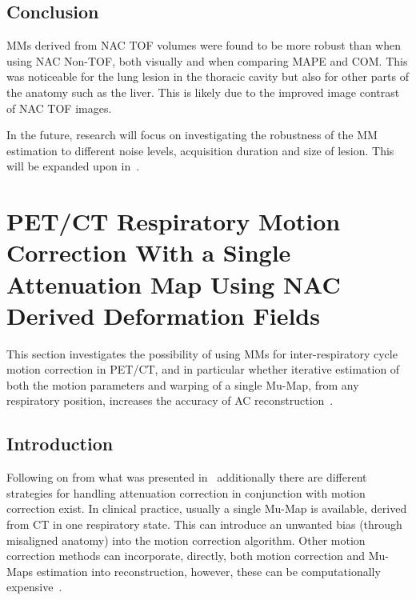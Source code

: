         \subsection{Conclusion} \label{sec:impact_of_tof_on_respiratory_motion_model_estimation_using_pre_gated_no_intra_cycle_motion_nac_pet_conclusion}
            \glspl{MM} derived from \gls{NAC} \gls{TOF} volumes were found to be more robust than when using \gls{NAC} \gls{Non-TOF}, both visually and when comparing \gls{MAPE} and \gls{COM}. This was noticeable for the lung lesion in the thoracic cavity but also for other parts of the anatomy such as the liver. This is likely due to the improved image contrast of \gls{NAC} \gls{TOF} images.

            In the future, research will focus on investigating the robustness of the \gls{MM} estimation to different noise levels, acquisition duration and size of lesion. This will be expanded upon in~.
    
    \section{PET/CT Respiratory Motion Correction With a Single Attenuation Map Using NAC Derived Deformation Fields} \label{sec:pet_ct_respiratory_motion_correction_with_a_single_attenuation_map_using_nac_derived_deformation_fields}
        This section investigates the possibility of using \glspl{MM} for inter-respiratory cycle motion correction in \gls{PET}/\gls{CT}, and in particular whether iterative estimation of both the motion parameters and warping of a single \gls{Mu-Map}, from any respiratory position, increases the accuracy of \gls{AC} reconstruction~\parencite{Whitehead2020PET/CTFields}.
        
        \subsection{Introduction} \label{sec:pet_ct_respiratory_motion_correction_with_a_single_attenuation_map_using_nac_derived_deformation_fields_introduction}
            Following on from what was presented in~ additionally there are different strategies for handling attenuation correction in conjunction with motion correction exist. In clinical practice, usually a single \gls{Mu-Map} is available, derived from \gls{CT} in one respiratory state. This can introduce an unwanted bias (through misaligned anatomy) into the motion correction algorithm. Other motion correction methods can incorporate, directly, both motion correction and \glspl{Mu-Map} estimation into reconstruction, however, these can be computationally expensive~\parencite{Bousse2016a, Bousse2016}.
            
